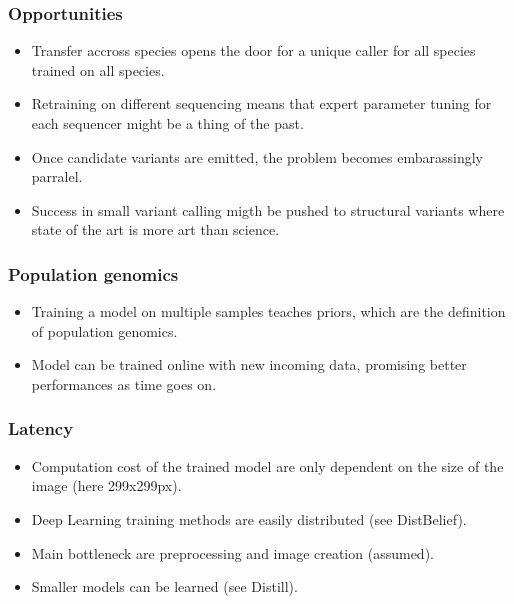 \documentclass{beamer}
\begin{document}
\begin{frame}
    \frametitle{Opportunities}

    \begin{itemize}
        \item Transfer accross species opens the door for a unique caller for all species trained on
            all species.
        \item Retraining on different sequencing means that expert parameter tuning for each
            sequencer might be a thing of the past.
        \item Once candidate variants are emitted, the problem becomes embarassingly parralel.
        \item Success in small variant calling migth be pushed to structural variants where state of
            the art is more art than science.
    \end{itemize}
\end{frame}

\begin{frame}
    \frametitle{Population genomics}

    \begin{itemize}
        \item Training a model on multiple samples teaches priors, which are the definition of
            population genomics.
        \item Model can be trained online with new incoming data, promising better performances as
            time goes on.
    \end{itemize}
\end{frame}

\begin{frame}
    \frametitle{Latency}

    \begin{itemize}
        \item Computation cost of the trained model are only dependent on the size of the image
            (here 299x299px).
        \item Deep Learning training methods are easily distributed (see DistBelief).
        \item Main bottleneck are preprocessing and image creation (assumed).
        \item Smaller models can be learned (see Distill).
    \end{itemize}
\end{frame}
\end{document}
